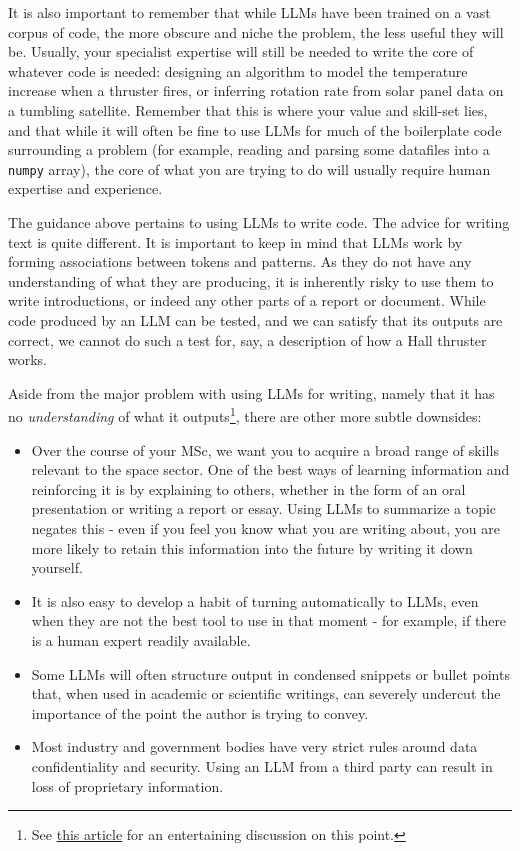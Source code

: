 \documentclass{tufte-book}
\begin{document}
It is also important to remember that while LLMs have been trained on a vast corpus of code, the more obscure and niche the problem, the less useful they will be. Usually, your specialist expertise will still be needed to write the core of whatever code is needed: designing an algorithm to model the temperature increase when a thruster fires, or inferring rotation rate from solar panel data on a tumbling satellite. Remember that this is where your value and skill-set lies, and that while it will often be fine to use LLMs for much of the boilerplate code surrounding a problem (for example, reading and parsing some datafiles into a \verb|numpy| array), the core of what you are trying to do will usually require human expertise and experience. 

The guidance above pertains to using LLMs to write code. The advice for writing text is quite different. It is important to keep in mind that LLMs work by forming associations between tokens and patterns. As they do not have any understanding of what they are producing, it is inherently risky to use them to write introductions, or indeed any other parts of a report or document. While code produced by an LLM can be tested, and we can satisfy that its outputs are correct, we cannot do such a test for, say, a description of how a Hall thruster works.

Aside from the major problem with using LLMs for writing, namely that it has no {\it understanding} of what it outputs\footnote{See \href{https://link.springer.com/article/10.1007/s10676-024-09775-5}{this article} for an entertaining discussion on this point.}, there are other more subtle downsides:

\begin{itemize}
    \item  Over the course of your MSc, we want you to acquire a broad range of skills relevant to the space sector. One of the best ways of learning information and reinforcing it is by explaining to others, whether in the form of an oral presentation or writing a report or essay. Using LLMs to summarize a topic negates this - even if you feel you know what you are writing about, you are more likely to retain this information into the future by writing it down yourself.
    \item It is also easy to develop a habit of turning automatically to LLMs, even when they are not the best tool to use in that moment - for example, if there is a human expert readily available.
    \item Some LLMs will often structure output in condensed snippets or bullet points that, when used in academic or scientific writings, can severely undercut the importance of the point the author is trying to convey.
    \item Most industry and government bodies have very strict rules around data confidentiality and security. Using an LLM from a third party can result in loss of proprietary information. 
\end{itemize}
\end{document}
